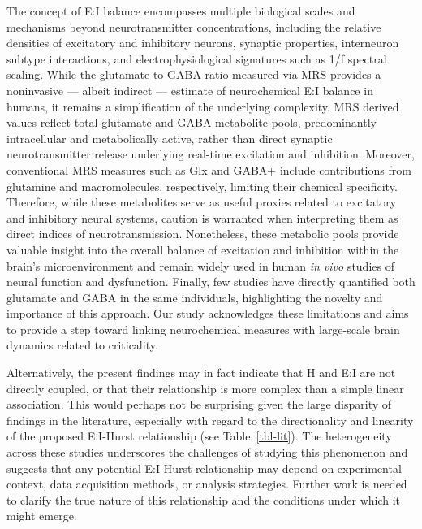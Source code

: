 \documentclass[
true
]{sn-jnl}
\begin{document}
The concept of E:I balance encompasses multiple biological scales and
mechanisms beyond neurotransmitter concentrations, including the
relative densities of excitatory and inhibitory neurons, synaptic
properties, interneuron subtype interactions, and electrophysiological
signatures such as 1/f spectral scaling. While the glutamate-to-GABA
ratio measured via MRS provides a noninvasive --- albeit indirect ---
estimate of neurochemical E:I balance in humans, it remains a
simplification of the underlying complexity. MRS derived values reflect
total glutamate and GABA metabolite pools, predominantly intracellular
and metabolically active, rather than direct synaptic neurotransmitter
release underlying real-time excitation and inhibition. Moreover,
conventional MRS measures such as Glx and GABA+ include contributions
from glutamine and macromolecules, respectively, limiting their chemical
specificity. Therefore, while these metabolites serve as useful proxies
related to excitatory and inhibitory neural systems, caution is
warranted when interpreting them as direct indices of neurotransmission.
Nonetheless, these metabolic pools provide valuable insight into the
overall balance of excitation and inhibition within the brain's
microenvironment and remain widely used in human \emph{in vivo} studies
of neural function and dysfunction. Finally, few studies have directly
quantified both glutamate and GABA in the same individuals, highlighting
the novelty and importance of this approach. Our study acknowledges
these limitations and aims to provide a step toward linking
neurochemical measures with large-scale brain dynamics related to
criticality.

Alternatively, the present findings may in fact indicate that H and E:I
are not directly coupled, or that their relationship is more complex
than a simple linear association. This would perhaps not be surprising
given the large disparity of findings in the literature, especially with
regard to the directionality and linearity of the proposed E:I-Hurst
relationship
\citep{liangExcitationInhibitionBalance2024, poilCriticalStateDynamicsAvalanches2012, lombardiBalanceExcitationInhibition2017, baumgartenCriticalExcitationinhibitionBalance2019, bruiningMeasurementExcitationinhibitionRatio2020, trakoshisIntrinsicExcitationinhibitionImbalance, gaoInferringSynapticExcitation2017}
(see Table~\ref{tbl-lit}). The heterogeneity across these studies
underscores the challenges of studying this phenomenon and suggests that
any potential E:I-Hurst relationship may depend on experimental context,
data acquisition methods, or analysis strategies. Further work is needed
to clarify the true nature of this relationship and the conditions under
which it might emerge.
\end{document}
